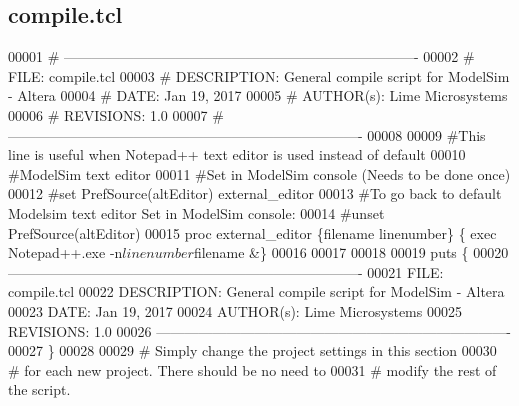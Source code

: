 \subsection{compile.\+tcl}
\label{top_2compile_8tcl_source}

\begin{DoxyCode}
00001 \textcolor{comment}{# ---------------------------------------------------------------------------- }
00002 \textcolor{comment}{}\textcolor{comment}{# FILE:    compile.tcl}
00003 \textcolor{comment}{}\textcolor{comment}{# DESCRIPTION: General compile script for ModelSim - Altera}
00004 \textcolor{comment}{}\textcolor{comment}{# DATE:    Jan 19, 2017}
00005 \textcolor{comment}{}\textcolor{comment}{# AUTHOR(s):   Lime Microsystems}
00006 \textcolor{comment}{}\textcolor{comment}{# REVISIONS: 1.0}
00007 \textcolor{comment}{}\textcolor{comment}{# ----------------------------------------------------------------------------}
00008 \textcolor{comment}{}
00009 \textcolor{comment}{#This line is useful when Notepad++ text editor is used instead of default }
00010 \textcolor{comment}{}\textcolor{comment}{#ModelSim text editor}
00011 \textcolor{comment}{}\textcolor{comment}{#Set in ModelSim console (Needs to be done once)}
00012 \textcolor{comment}{}\textcolor{comment}{#set PrefSource(altEditor) external\_editor}
00013 \textcolor{comment}{}\textcolor{comment}{#To go back to default Modelsim text editor Set in ModelSim console:}
00014 \textcolor{comment}{}\textcolor{comment}{#unset PrefSource(altEditor)}
00015 \textcolor{comment}{}\textcolor{keyword}{proc} external\_editor \{filename linenumber\} \{ \textcolor{keyword}{exec} Notepad++.exe -n$linenumber $filename &\}\textcolor{comment}{}
00016 \textcolor{comment}{}
00017 
00018 
00019 \textcolor{keyword}{puts} \{
00020  ----------------------------------------------------------------------------  
00021  FILE:     compile.tcl
00022  DESCRIPTION:  General compile script for ModelSim - Altera
00023  DATE: Jan 19, 2017
00024  AUTHOR(s):    Lime Microsystems
00025  REVISIONS: 1.0
00026  ----------------------------------------------------------------------------
00027 \}\textcolor{comment}{}
00028 \textcolor{comment}{}
00029 \textcolor{comment}{# Simply change the project settings in this section}
00030 \textcolor{comment}{}\textcolor{comment}{# for each new project. There should be no need to}
00031 \textcolor{comment}{}\textcolor{comment}{# modify the rest of the script.}

\end{DoxyCode}
